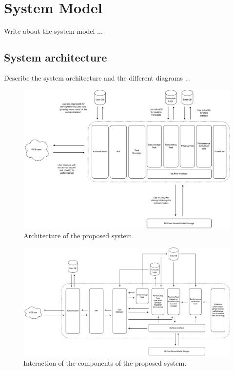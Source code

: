 \chapter{System Model}
\label{cha:system}
\vspace{0.4 cm}

Write about the system model ...


\section{System architecture}
\label{sec:architecture}
\vspace{0.2 cm}

Describe the system architecture and the different diagrams ...

\begin{figure}[H]
\centering 
\includegraphics[width=1\textwidth]{images/architecture_components} 
\caption{Architecture of the proposed system.}
\label{fig:components}
\end{figure}

\begin{figure}[H]
\centering 
\includegraphics[width=1\textwidth]{images/architecture_interactions} 
\caption{Interaction of the components of the proposed system.}
\label{fig:interactions}
\end{figure}

